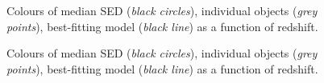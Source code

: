 \begin{figure}
\caption{Colours of median SED ({\it black circles}), individual objects ({\it grey points}), best-fitting  model ({\it black line}) as a function of redshift.}
  \label{fig:color_1}
\end{figure} 


\begin{figure}
\caption{Colours of median SED ({\it black circles}), individual objects ({\it grey points}), best-fitting  model ({\it black line}) as a function of redshift.}
  \label{fig:color_2}
\end{figure} 

